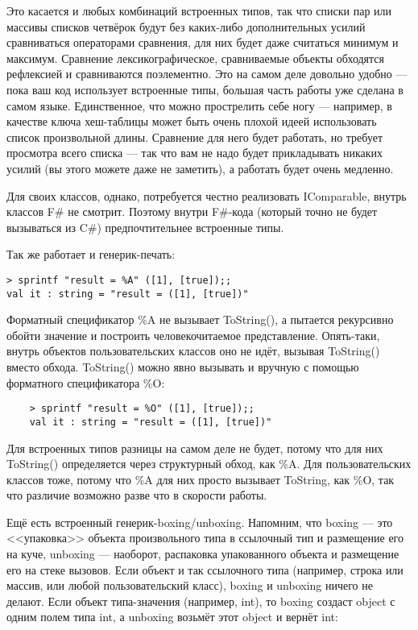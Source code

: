 \documentclass{../../text-style}
\begin{document}
Это касается и любых комбинаций встроенных типов, так что списки пар или массивы списков четвёрок будут без каких-либо дополнительных усилий сравниваться операторами сравнения, для них будет даже считаться минимум и максимум. Сравнение лексикографическое, сравниваемые объекты обходятся рефлексией и сравниваются поэлементно. Это на самом деле довольно удобно --- пока ваш код использует встроенные типы, большая часть работы уже сделана в самом языке. Единственное, что можно прострелить себе ногу --- например, в качестве ключа хеш-таблицы может быть очень плохой идеей использовать список произвольной длины. Сравнение для него будет работать, но требует просмотра всего списка --- так что вам не надо будет прикладывать никаких усилий (вы этого можете даже не заметить), а работать будет очень медленно. 

Для своих классов, однако, потребуется честно реализовать IComparable, внутрь классов F\# не смотрит. Поэтому внутри F\#-кода (который точно не будет вызываться из C\#) предпочтительнее встроенные типы.

Так же работает и генерик-печать:

\begin{verbatim}
> sprintf "result = %A" ([1], [true]);;
val it : string = "result = ([1], [true])"
\end{verbatim}

Форматный спецификатор \%A не вызывает ToString(), а пытается рекурсивно обойти значение и построить человекочитаемое представление. Опять-таки, внутрь объектов пользовательских классов оно не идёт, вызывая ToString() вместо обхода. ToString() можно явно вызывать и вручную с помощью форматного спецификатора \%O:

\begin{verbatim}
    > sprintf "result = %O" ([1], [true]);;
    val it : string = "result = ([1], [true])"
\end{verbatim}

Для встроенных типов разницы на самом деле не будет, потому что для них ToString() определяется через структурный обход, как \%A. Для пользовательских классов тоже, потому что \%A для них просто вызывает ToString, как \%O, так что различие возможно разве что в скорости работы.

Ещё есть встроенный генерик-boxing/unboxing. Напомним, что boxing --- это <<упаковка>> объекта произвольного типа в ссылочный тип и размещение его на куче, unboxing --- наоборот, распаковка упакованного объекта и размещение его на стеке вызовов. Если объект и так ссылочного типа (например, строка или массив, или любой пользовательский класс), boxing и unboxing ничего не делают. Если объект типа-значения (например, int), то boxing создаст object с одним полем типа int, а unboxing возьмёт этот object и вернёт int: 
\end{document}
